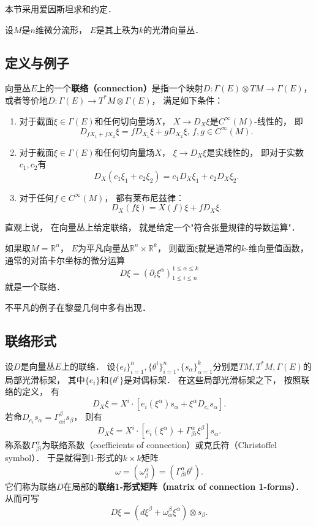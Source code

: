 
本节采用爱因斯坦求和约定．

设$M$是$n$维微分流形， $E$是其上秩为$k$的光滑向量丛． 

\subsection{定义与例子}
向量丛$E$上的一个\textbf{联络（connection）}是指一个映射$D:\Gamma(E)\otimes TM\to\Gamma(E)$， 或者等价地$D:\Gamma(E)\to T^*M\otimes\Gamma(E)$， 满足如下条件：

\begin{enumerate}
\item 对于截面$\xi\in\Gamma(E)$和任何切向量场$X$， $X\to D_X\xi$是$C^\infty(M)$-线性的， 即
$$
D_{fX_1+fX_2}\xi=fD_{X_1}\xi+gD_{X_2}\xi,\,f,g\in C^\infty(M).
$$
\item 对于截面$\xi\in\Gamma(E)$和任何切向量场$X$， $\xi\to D_X\xi$是实线性的， 即对于实数$c_1,c_2$有
$$
D_X(c_1\xi_1+c_2\xi_2)=c_1D_X\xi_1+c_2D_X\xi_2.
$$
\item 对于任何$f\in C^\infty(M)$， 都有莱布尼兹律：
$$
D_X(f\xi)=X(f)\xi+fD_X\xi.
$$
\end{enumerate}

直观上说， 在向量丛上给定联络， 就是给定一个"符合张量规律的导数运算"． 

如果取$M=\mathbb{R}^n$， $E$为平凡向量丛$\mathbb{R}^n\times\mathbb{R}^k$， 则截面$\xi$就是通常的$k$-维向量值函数， 通常的对笛卡尔坐标的微分运算
$$
D\xi=(\partial_i\xi^\alpha)_{1\leq i\leq n}^{1\leq\alpha\leq k}
$$
就是一个联络．

不平凡的例子在黎曼几何中多有出现．

\subsection{联络形式}
设$D$是向量丛$E$上的联络． 设$\{e_i\}_{i=1}^n,\{\theta^i\}_{i=1}^n,\{s_\alpha\}_{\alpha=1}^k$分别是$TM,T^*M,\Gamma(E)$的局部光滑标架， 其中$\{e_i\}$和$\{\theta^i\}$是对偶标架． 在这些局部光滑标架之下， 按照联络的定义， 有
$$
D_X\xi=X^i\cdot\left[e_i(\xi^\alpha)s_\alpha+\xi^\alpha D_{e_i}s_\alpha\right].
$$
若命$D_{e_i}s_\alpha=\Gamma_{\alpha i}^\beta s_\beta$， 则有
$$
D_X\xi=X^i\cdot\left[e_i(\xi^\alpha)+\Gamma_{\beta i}^\alpha\xi^\beta \right]s_\alpha.
$$
称系数$\Gamma^\alpha_{\beta i}$为联络系数（coefficients of connection）或克氏符（Christoffel symbol）． 于是就得到1-形式的$k\times k$矩阵
$$
\omega=(\omega_\beta^\alpha)=(\Gamma_{\beta i}^\alpha\theta^i).
$$
它们称为联络$D$在局部的\textbf{联络1-形式矩阵（matrix of connection 1-forms）}． 从而可写
$$
D\xi=(d\xi^\beta+\omega_\alpha^\beta\xi^\alpha)\otimes s_\beta.
$$

